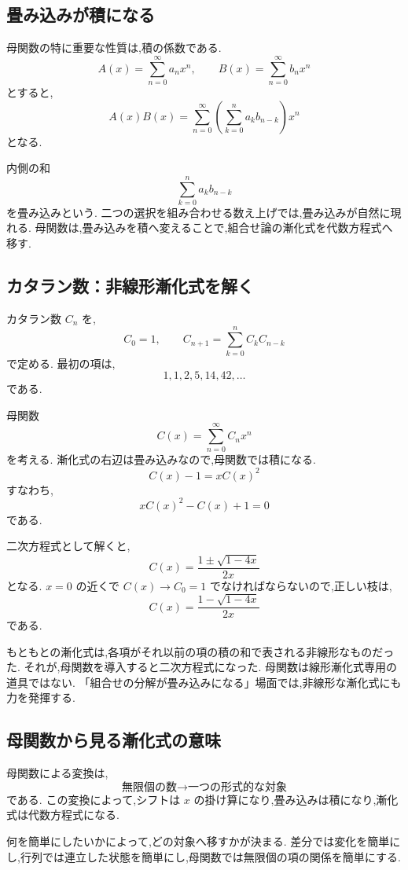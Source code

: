 \subsection{畳み込みが積になる}

母関数の特に重要な性質は,積の係数である.
\[
  A(x)=\sum_{n=0}^{\infty}a_nx^n,\qquad
  B(x)=\sum_{n=0}^{\infty}b_nx^n
\]
とすると,
\[
  A(x)B(x)
  =
  \sum_{n=0}^{\infty}
  \left(\sum_{k=0}^{n}a_kb_{n-k}\right)x^n
\]
となる.

内側の和
\[
  \sum_{k=0}^{n}a_kb_{n-k}
\]
を畳み込みという.
二つの選択を組み合わせる数え上げでは,畳み込みが自然に現れる.
母関数は,畳み込みを積へ変えることで,組合せ論の漸化式を代数方程式へ移す.

\subsection{カタラン数：非線形漸化式を解く}

カタラン数 $C_n$ を,
\[
  C_0=1,\qquad
  C_{n+1}=\sum_{k=0}^{n}C_kC_{n-k}
\]
で定める.
最初の項は,
\[
  1,1,2,5,14,42,\ldots
\]
である.

母関数
\[
  C(x)=\sum_{n=0}^{\infty}C_nx^n
\]
を考える.
漸化式の右辺は畳み込みなので,母関数では積になる.
\[
  C(x)-1=xC(x)^2
\]
すなわち,
\[
  xC(x)^2-C(x)+1=0
\]
である.

二次方程式として解くと,
\[
  C(x)=\frac{1\pm\sqrt{1-4x}}{2x}
\]
となる.
$x=0$ の近くで $C(x)\to C_0=1$ でなければならないので,正しい枝は,
\[
  C(x)=\frac{1-\sqrt{1-4x}}{2x}
\]
である.

もともとの漸化式は,各項がそれ以前の項の積の和で表される非線形なものだった.
それが,母関数を導入すると二次方程式になった.
母関数は線形漸化式専用の道具ではない.
「組合せの分解が畳み込みになる」場面では,非線形な漸化式にも力を発揮する.

\subsection{母関数から見る漸化式の意味}

母関数による変換は,
\[
  \text{無限個の数}
  \longrightarrow
  \text{一つの形式的な対象}
\]
である.
この変換によって,シフトは $x$ の掛け算になり,畳み込みは積になり,漸化式は代数方程式になる.

何を簡単にしたいかによって,どの対象へ移すかが決まる.
差分では変化を簡単にし,行列では連立した状態を簡単にし,母関数では無限個の項の関係を簡単にする.
